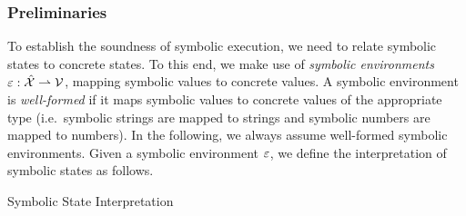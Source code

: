 \subsubsection{Preliminaries}
To establish the soundness of symbolic execution, we need to relate 
symbolic states to concrete states. To this end, we make use of \emph{symbolic environments} 
$\varepsilon : \hat{\mathcal{X}} \rightharpoonup \mathcal{V}$, mapping symbolic values to concrete values. 
A symbolic environment is \emph{well-formed} if it maps symbolic 
values to concrete values of the appropriate type (i.e.~symbolic strings are mapped to strings 
and symbolic numbers are mapped to numbers). In the following, we always 
assume well-formed symbolic environments. 
Given a symbolic environment $\varepsilon$, we define the interpretation of symbolic states as follows. 

\begin{display}{Symbolic State Interpretation}
{\scriptsize 
{}}
\end{display}
